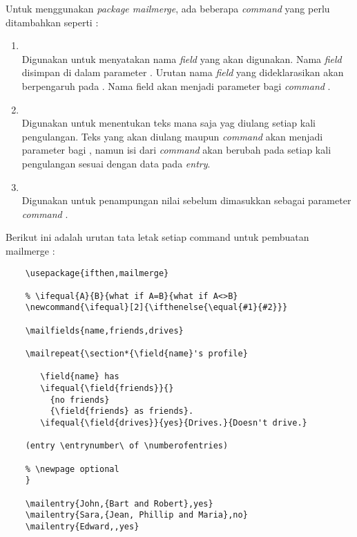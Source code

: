 Untuk menggunakan \textit{package mailmerge}, ada beberapa \textit{command} yang perlu ditambahkan seperti \cite{Frasson:2009} :
\begin{enumerate}
	\item \texttt{\string\mailfields}\\
	Digunakan untuk menyatakan nama \textit{field} yang akan digunakan. Nama \textit{field} disimpan di dalam parameter \texttt{\string\mailfields}. Urutan nama \textit{field} yang dideklarasikan akan berpengaruh pada \texttt{\string\mailentry}. Nama field akan menjadi parameter bagi \textit{command} \texttt{\string\field}.
	\item \texttt{\string\mailrepeat}\\
	Digunakan untuk menentukan teks mana saja yag diulang setiap kali pengulangan. Teks yang akan diulang maupun \textit{command} \texttt{\string\field} akan menjadi parameter bagi \texttt{\string\mailrepeat}, namun isi dari \textit{command} \texttt{\string\field} akan berubah pada setiap kali pengulangan sesuai dengan data pada \textit{entry}.
	\item \texttt{\string\mailentry}\\
	Digunakan untuk penampungan nilai sebelum dimasukkan sebagai parameter \textit{command} \texttt{\string\field}.
\end{enumerate}
	Berikut ini adalah urutan tata letak setiap command untuk pembuatan mailmerge :
	\begin{verbatim}
    \usepackage{ifthen,mailmerge}

    % \ifequal{A}{B}{what if A=B}{what if A<>B}
    \newcommand{\ifequal}[2]{\ifthenelse{\equal{#1}{#2}}}

    \mailfields{name,friends,drives}

    \mailrepeat{\section*{\field{name}'s profile}

       \field{name} has
       \ifequal{\field{friends}}{}
         {no friends}
         {\field{friends} as friends}.
       \ifequal{\field{drives}}{yes}{Drives.}{Doesn't drive.}

    (entry \entrynumber\ of \numberofentries)

    % \newpage optional
    }

    \mailentry{John,{Bart and Robert},yes}
    \mailentry{Sara,{Jean, Phillip and Maria},no}
    \mailentry{Edward,,yes}
 \end{verbatim}
		
